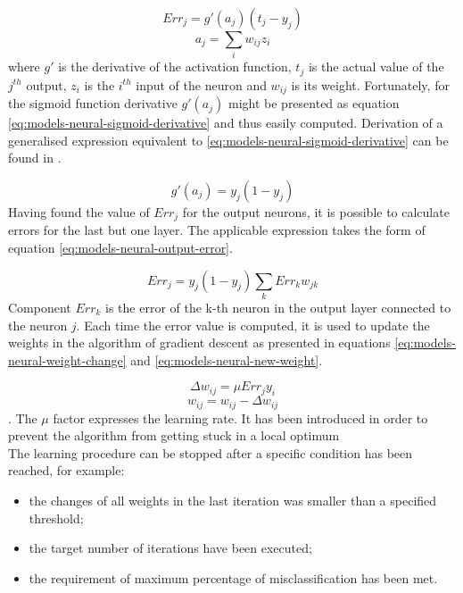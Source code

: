 \begin{equation}\label{eq:models-neural-error}
Err_j = g'(a_j) (t_j - y_j)
\end{equation}
\begin{equation}\label{eq:models-neural-neuron-output}
a_j=\sum_{i} w_{ij} z_i
\end{equation}
where $g'$ is the derivative of the activation function, $t_j$ is the actual value of the $j^{th}$ output, $z_i$ is the $i^{th}$ input of the neuron and $w_{ij}$ is its weight. Fortunately, for the sigmoid function derivative $g'(a_j)$ might be presented as equation \ref{eq:models-neural-sigmoid-derivative} and thus easily computed. Derivation of a generalised expression equivalent to \ref{eq:models-neural-sigmoid-derivative} can be found in \cite{BISHOP1995}.

\begin{equation} \label{eq:models-neural-sigmoid-derivative}
g'(a_j) = y_j (1 - y_j)
\end{equation}
Having found the value of $Err_j$ for the output neurons, it is possible to calculate errors for the last but one layer. The applicable expression takes the form of equation \ref{eq:models-neural-output-error}.

\begin{equation}\label{eq:models-neural-output-error}
Err_j = y_j(1-y_j) \sum_{k} Err_k w_{jk}
\end{equation}
Component $Err_k$ is the error of the k-th neuron in the output layer connected to the neuron $j$. Each time the error value is computed, it is used to update the weights in the algorithm of gradient descent as presented in equations \ref{eq:models-neural-weight-change} and \ref{eq:models-neural-new-weight}.

\begin{equation}\label{eq:models-neural-weight-change}
\Delta w_{ij} = \mu Err_j y_i
\end{equation}
\begin{equation}\label{eq:models-neural-new-weight}
w_{ij} = w_{ij} - \Delta w_{ij}
\end{equation}.
The $\mu$ factor expresses the learning rate. It has been introduced in order to prevent the algorithm from getting stuck in a local optimum
\\
The learning procedure can be stopped after a specific condition has been reached, for example:
\begin{itemize}
	\item the changes of all weights in the last iteration was smaller than a specified threshold; 
	\item the target number of iterations have been executed;
	\item the requirement of maximum percentage of misclassification has been met.
\end{itemize}